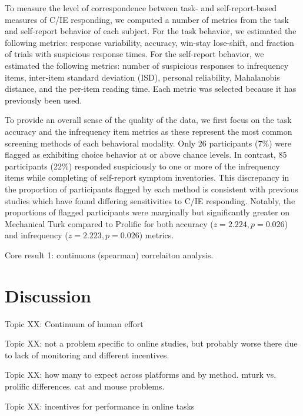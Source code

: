 \documentclass[a4paper,notitlepage,12pt]{article}
\begin{document}
To measure the level of correspondence between task- and self-report-based measures of C/IE responding, we computed a number of metrics from the task and self-report behavior of each subject. For the task behavior, we estimated the following metrics: response variability, accuracy, win-stay lose-shift, and fraction of trials with suspicious response times. For the self-report behavior, we estimated the following metrics: number of suspicious responses to infrequency items, inter-item standard deviation (ISD), personal reliability, Mahalanobis distance, and the per-item reading time. Each metric was selected because it has previously been used.

To provide an overall sense of the quality of the data, we first focus on the task accuracy and the infrequency item metrics as these represent the most common screening methods of each behavioral modality. Only 26 participants (7\%) were flagged as exhibiting choice behavior at or above chance levels. In contrast, 85 participants (22\%) responded suspiciously to one or more of the infrequency items while completing of self-report symptom inventories. This discrepancy in the proportion of participants flagged by each method is consistent with previous studies which have found differing sensitivities to C/IE responding. Notably, the proportions of flagged participants were marginally but significantly greater on Mechanical Turk compared to Prolific for both accuracy ($z=2.224, p=0.026$) and infrequency ($z = 2.223, p = 0.026$) metrics.


Core result 1: continuous (spearman) correlaiton analysis. 

\subsection{}

\section{Discussion}

Topic XX: Continuum of human effort

Topic XX: not a problem specific to online studies, but probably worse there due to lack of monitoring and different incentives.

Topic XX: how many to expect across platforms and by method. mturk vs. prolific differences. cat and mouse problems.

Topic XX: incentives for performance in online tasks
\end{document}
